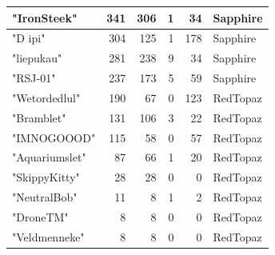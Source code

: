 \documentclass{article}
\begin{document}
\begin{table}[htbp]
\begin{tabular}{|l|r|r|r|r|l|}
"IronSteek" & 341 & 306 & 1 & 34 & Sapphire \\ \hline
"D ipi" & 304 & 125 & 1 & 178 & Sapphire \\ \hline
"liepukau" & 281 & 238 & 9 & 34 & Sapphire \\ \hline
"RSJ-01" & 237 & 173 & 5 & 59 & Sapphire \\ \hline
"Wetordedlul" & 190 & 67 & 0 & 123 & RedTopaz \\ \hline
"Bramblet" & 131 & 106 & 3 & 22 & RedTopaz \\ \hline
"IMNOGOOOD" & 115 & 58 & 0 & 57 & RedTopaz \\ \hline
"Aquariumslet" & 87 & 66 & 1 & 20 & RedTopaz \\ \hline
"SkippyKitty" & 28 & 28 & 0 & 0 & RedTopaz \\ \hline
"NeutralBob" & 11 & 8 & 1 & 2 & RedTopaz \\ \hline
"DroneTM" & 8 & 8 & 0 & 0 & RedTopaz \\ \hline
"Veldmenneke" & 8 & 8 & 0 & 0 & RedTopaz \\ \hline
\end{tabular}
\end{table}
\end{document}
